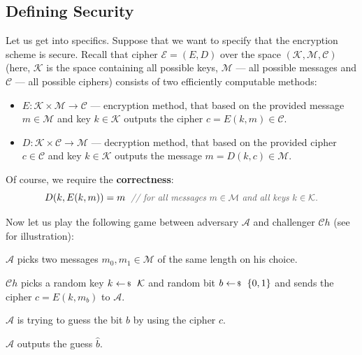 \documentclass[../../book.tex]{subfiles}
\begin{document}
\subsection{Defining Security}\label{subsec:defining-security}
Let us get into specifics. Suppose that we want to specify that the encryption scheme is secure. Recall that 
cipher $\mathcal{E} = (E,D)$ over the space $(\mathcal{K}, \mathcal{M}, \mathcal{C})$ (here, $\mathcal{K}$ is 
the space containing all possible keys, $\mathcal{M}$ --- all possible messages and $\mathcal{C}$ --- all 
possible ciphers) consists of two efficiently computable methods:
\begin{itemize}
    \item $E: \mathcal{K} \times \mathcal{M} \to \mathcal{C}$ --- encryption method, that based on the provided message $m \in \mathcal{M}$ and key $k \in \mathcal{K}$ outputs the cipher $c = E(k,m) \in \mathcal{C}$.
    \item $D: \mathcal{K} \times \mathcal{C} \to \mathcal{M}$ --- decryption method, that based on the provided cipher $c \in \mathcal{C}$ and key $k \in \mathcal{K}$ outputs the message $m = D(k,c) \in \mathcal{M}$.
\end{itemize}

Of course, we require the \textbf{correctness}:
\begin{equation*}
    D(k,E(k,m)) = m \; \commentgray{for all messages $m \in \mathcal{M}$ and all keys $k \in \mathcal{K}$.}
\end{equation*}

Now let us play the following game between adversary $\mathcal{A}$ and challenger $\mathcal{C}h$ (see  for illustration):
\begin{algoen}
    \item $\mathcal{A}$ picks two messages $m_0,m_1 \in \mathcal{M}$ of the same length on his choice.
    \item $\mathcal{C}h$ picks a random key $k \leftarrowS \mathcal{K}$ and random bit $b \leftarrowS \{0,1\}$ and sends the cipher $c = E(k,m_b)$ to $\mathcal{A}$.
    \item $\mathcal{A}$ is trying to guess the bit $b$ by using the cipher $c$.
    \item $\mathcal{A}$ outputs the guess $\widehat{b}$.
\end{algoen}
\end{document}
